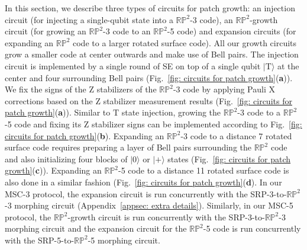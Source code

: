 \documentclass[reprint,aps,twocolumn,superscriptaddress,showpacs,notitlepage,10pt]{revtex4-2}
\theoremstyle{definition}
\begin{document}
In this section, we describe three types of circuits for patch growth: an injection circuit (for injecting a single-qubit state into a $\mathbb{RP}^2$-3 code), an $\mathbb{RP}^2$-growth circuit (for growing an $\mathbb{RP}^2$-3 code to an $\mathbb{RP}^2$-5 code) and expansion circuits (for expanding an $\mathbb{RP}^2$ code to a larger rotated surface code). All our growth circuits grow a smaller code at center outwards and make use of Bell pairs.  The injection circuit is implemented by a single round of SE on top of a single qubit $|\mathrm{T}\rangle$ at the center and four surrounding Bell pairs (Fig.~\ref{fig: circuits for patch growth}(\textbf{a})). We fix the signs of the Z stabilizers of the $\mathbb{RP}^2$-3 code by applying Pauli $\mathrm{X}$ corrections based on the Z stabilizer measurement results (Fig.~\ref{fig: circuits for patch growth}(\textbf{a})). Similar to $\mathrm{T}$ state injection, growing the $\mathbb{RP}^2$-3 code to a $\mathbb{RP}^2$-5 code and fixing its Z stabilizer signs can be implemented according to Fig.~\ref{fig: circuits for patch growth}(\textbf{b}). Expanding an $\mathbb{RP}^2$-3 code to a distance 7 rotated surface code requires preparing a layer of Bell pairs surrounding the $\mathbb{RP}^2$ code and also initializing four blocks of $|0\rangle$ or $|+\rangle$ states (Fig.~\ref{fig: circuits for patch growth}(\textbf{c})). Expanding an $\mathbb{RP}^2$-5 code to a distance 11 rotated surface code is also done in a similar fashion (Fig.~\ref{fig: circuits for patch growth}(\textbf{d}). In our MSC-3 protocol, the expansion circuit is run concurrently with the  SRP-3-to-$\mathbb{RP}^2$-3 morphing circuit (Appendix~\ref{appsec: extra details}). Similarly, in our MSC-5 protocol, the $\mathbb{RP}^2$-growth circuit is run concurrently with the SRP-3-to-$\mathbb{RP}^2$-3 morphing circuit and the expansion circuit for the $\mathbb{RP}^2$-5 code is run concurrently with the SRP-5-to-$\mathbb{RP}^2$-5 morphing circuit.   
\end{document}
